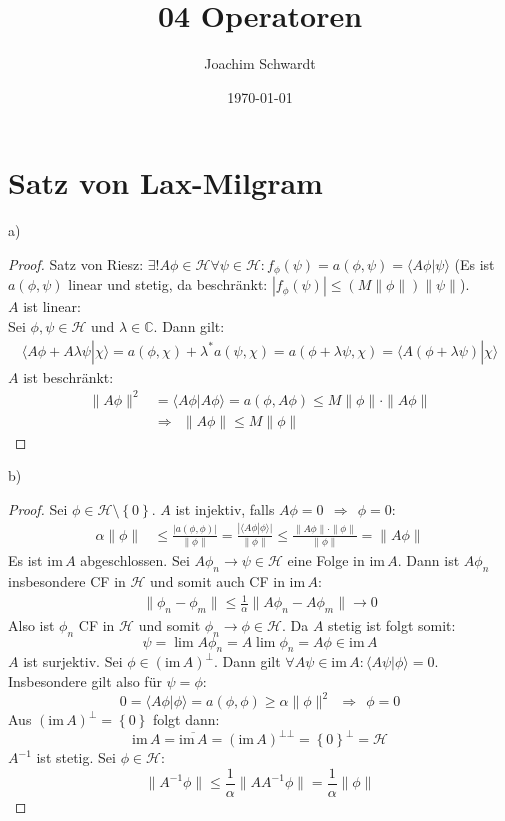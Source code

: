 \documentclass[a4paper,12pt]{article}
\newcommand{\brak}{}
\newcommand{\klammer}{}
\begin{document}
\title{04 Operatoren}
\author{Joachim Schwardt}
\date{\today}
\maketitle

\section{Satz von Lax-Milgram}
a)
\begin{proof}
Satz von Riesz: $\exists !A\phi\in\mathcal{H}\forall\psi\in\mathcal{H}:f_\phi (\psi)=a(\phi,\psi)=\brak\langle {A\phi}| {\psi}\rangle$ (Es ist $a(\phi,\psi)$ linear und stetig, da beschränkt: $|f_\phi(\psi)|\le (M\|\phi\|)\|\psi\|$).\\
$A$ ist linear:\\
Sei $\phi,\psi\in\mathcal{H}$ und $\lambda\in\mathbb{C}$. Dann gilt:
\begin{align*}
\brak\langle {A\phi+A\lambda\psi}| {\chi}\rangle=a(\phi,\chi)+\lambda^\ast a(\psi,\chi)=a(\phi+\lambda\psi,\chi)=\brak\langle {A(\phi+\lambda\psi)}| {\chi}\rangle
\end{align*}
$A$ ist beschränkt:
\begin{align*}
\|A\phi\|^2&=\brak\langle {A\phi}| {A\phi}\rangle=a(\phi,A\phi)\le M\|\phi\|\cdot\|A\phi\|\\
&\Rightarrow\ \ \|A\phi\|\le M\|\phi\|
\end{align*}
\end{proof}
b)
\begin{proof}
Sei $\phi\in\mathcal{H}\setminus\klammer\left\{ {0} \right\}$. $A$ ist injektiv, falls $A\phi=0\ \ \Rightarrow\ \ \phi=0$:
\begin{align*}
\alpha\|\phi\|&\le\frac{|a(\phi,\phi)|}{\|\phi\|}=\frac{|\brak\langle {A\phi}| {\phi}\rangle|}{\|\phi\|}\le\frac{\|A\phi\|\cdot\|\phi\|}{\|\phi\|}=\|A\phi\|
\end{align*}
Es ist $\mathrm{im\,}A$ abgeschlossen. Sei $A\phi_n\rightarrow\psi\in\mathcal{H}$ eine Folge in $\mathrm{im\,}A$. Dann ist $A\phi_n$ insbesondere CF in $\mathcal{H}$ und somit auch CF in $\mathrm{im\,}A$:
\begin{align*}
\|\phi_n-\phi_m\|\le\frac{1}{\alpha}\|A\phi_n-A\phi_m\|\rightarrow 0
\end{align*}
Also ist $\phi_n$ CF in $\mathcal{H}$ und somit $\phi_n\rightarrow\phi\in\mathcal{H}$. Da $A$ stetig ist folgt somit:
$$\psi=\lim A\phi_n= A\lim\phi_n=A\phi\in \mathrm{im\,}A$$
$A$ ist surjektiv. Sei $\phi\in (\mathrm{im\,}A)^\bot$. Dann gilt $\forall A\psi\in\mathrm{im\,}A:\brak\langle {A\psi}| {\phi}\rangle=0$. Insbesondere gilt also für $\psi=\phi$:
$$0=\brak\langle {A\phi}| {\phi}\rangle=a(\phi,\phi)\ge\alpha\|\phi\|^2\ \ \Rightarrow\ \ \phi=0$$
Aus $(\mathrm{im\,}A)^\bot=\klammer\left\{ {0} \right\}$ folgt dann:
$$\mathrm{im\,}A=\overline{\mathrm{im\,}A}=(\mathrm{im\,}A)^{\bot \bot}=\klammer\left\{ {0} \right\}^\bot=\mathcal{H}$$
$A^{-1}$ ist stetig. Sei $\phi\in\mathcal{H}$:
$$\|A^{-1}\phi\|\le\frac{1}{\alpha}\|AA^{-1}\phi\|=\frac{1}{\alpha}\|\phi\|$$
\end{proof}
\end{document}
